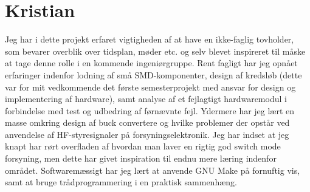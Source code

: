 \section{Kristian}

Jeg har i dette projekt erfaret vigtigheden af at have en ikke-faglig tovholder, som bevarer overblik over tidsplan, møder etc. og selv blevet inspireret til måske at tage denne rolle i en kommende ingeniørgruppe.
Rent fagligt har jeg opnået erfaringer indenfor lodning af små SMD-komponenter, design af kredsløb (dette var for mit vedkommende det første semesterprojekt med ansvar for design og implementering af hardware), samt analyse af et fejlagtigt hardwaremodul i forbindelse med test og udbedring af førnævnte fejl.
Ydermere har jeg lært en masse omkring design af buck convertere og hvilke problemer der opstår ved anvendelse af HF-styresignaler på forsyningselektronik.
Jeg har indset at jeg knapt har rørt overfladen af hvordan man laver en rigtig god switch mode forsyning, men dette har givet inspiration til endnu mere læring indenfor området.
Softwaremæssigt har jeg lært at anvende GNU Make på fornuftig vis, samt at bruge trådprogrammering i en praktisk sammenhæng.